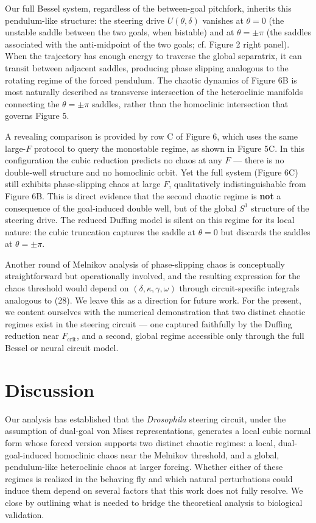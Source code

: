 \documentclass[11pt]{article}
\begin{document}
Our full Bessel system, regardless of the between-goal pitchfork, inherits this pendulum-like structure: the steering drive $U(\theta, \delta)$ vanishes at $\theta = 0$ (the unstable saddle between the two goals, when bistable) and at $\theta = \pm\pi$ (the saddles associated with the anti-midpoint of the two goals; cf. Figure 2 right panel). When the trajectory has enough energy to traverse the global separatrix, it can transit between adjacent saddles, producing phase slipping analogous to the rotating regime of the forced pendulum. The chaotic dynamics of Figure 6B is most naturally described as transverse intersection of the heteroclinic manifolds connecting the $\theta = \pm\pi$ saddles, rather than the homoclinic intersection that governs Figure 5.

A revealing comparison is provided by row C of Figure 6, which uses the same large-$F$ protocol to query the monostable regime, as shown in Figure 5C. In this configuration the cubic reduction predicts no chaos at any $F$ --- there is no double-well structure and no homoclinic orbit. Yet the full system (Figure 6C) still exhibits phase-slipping chaos at large $F$, qualitatively indistinguishable from Figure 6B. This is direct evidence that the second chaotic regime is \textbf{not} a consequence of the goal-induced double well, but of the global $S^1$ structure of the steering drive. The reduced Duffing model is silent on this regime for its local nature: the cubic truncation captures the saddle at $\theta = 0$ but discards the saddles at $\theta = \pm\pi$.

Another round of Melnikov analysis of phase-slipping chaos is conceptually straightforward but operationally involved, and the resulting expression for the chaos threshold would depend on $(\delta, \kappa, \gamma, \omega)$ through circuit-specific integrals analogous to (28). We leave this as a direction for future work. For the present, we content ourselves with the numerical demonstration that two distinct chaotic regimes exist in the steering circuit --- one captured faithfully by the Duffing reduction near $F_{\text{crit}}$, and a second, global regime accessible only through the full Bessel or neural circuit model.

\section{Discussion}

Our analysis has established that the \textit{Drosophila} steering circuit, under the assumption of dual-goal von Mises representations, generates a local cubic normal form whose forced version supports two distinct chaotic regimes: a local, dual-goal-induced homoclinic chaos near the Melnikov threshold, and a global, pendulum-like heteroclinic chaos at larger forcing. Whether either of these regimes is realized in the behaving fly and which natural perturbations could induce them depend on several factors that this work does not fully resolve. We close by outlining what is needed to bridge the theoretical analysis to biological validation.
\end{document}
